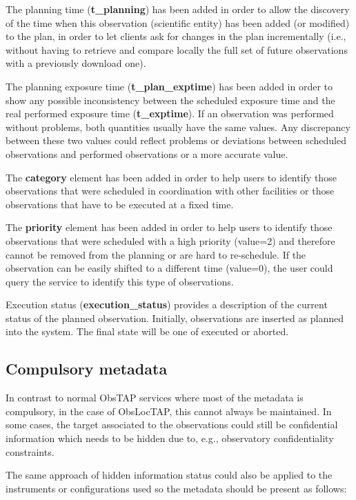 \documentclass[11pt,a4paper]{ivoa}
\begin{document}
The planning time (\textbf{t\_planning}) has been added in order to allow the
discovery of the time when this observation (scientific entity) has been added
(or modified) to the plan, in order to let clients ask for changes in the plan
incrementally (i.e., without having to retrieve and compare locally the full set
of future observations with a previously download one).

The planning exposure time (\textbf{t\_plan\_exptime}) has been added in order
to show any possible inconsistency between the scheduled exposure time and the
real performed exposure time (\textbf{t\_exptime}). If an observation was
performed without problems, both quantities usually have the same values. Any
discrepancy between these two values could reflect problems or deviations between
scheduled observations and performed observations or a more accurate value.

The \textbf{category} element has been added in order to help users to identify
those observations that were scheduled in coordination with other facilities or
those observations that have to be executed at a fixed time.

The \textbf{priority} element has been added in order to help users to identify
those observations that were scheduled with a high priority (value=2) and
therefore cannot be removed from the planning or are hard to re-schedule. If the
observation can be easily shifted to a different time (value=0), the user could
query the service to identify this type of observations.

Execution status (\textbf{execution\_status}) provides a description of the current status of the planned
observation. Initially, observations are inserted as planned into the system.
The final state will be one of executed or aborted.

\subsection{Compulsory metadata}
In contrast to normal ObsTAP services where most of the metadata is compulsory,
in the case of ObsLocTAP, this cannot always be maintained. In some cases, the
target associated to the observations could still be confidential information
which needs to be hidden due to, e.g., observatory confidentiality constraints.

The same approach of hidden information status could also be applied to the
instruments or configurations used so the metadata should be present as follows:
\end{document}
